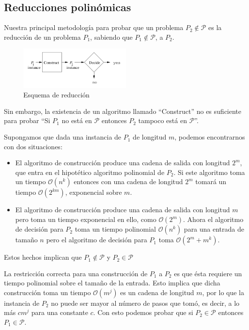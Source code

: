 \documentclass[a4paper]{article}
\begin{document}


\subsection{Reducciones polinómicas}
Nuestra principal metodología para probar que un problema $P_2 \notin \mathcal{P}$
es la reducción de un problema $P_1$, sabiendo que $P_1 \notin \mathcal{P}$, a $P_2$.

\begin{figure}[h]
\centering
\graphicspath{ {./Images/} }
\includegraphics[width=0.5\textwidth]{reduccion.png}
\caption{\label{fig:Reduccion}Esquema de reducción\cite{hopcroft2001introduction}}
\end{figure}
Sin embargo, la existencia de un algoritmo llamado ``Construct'' no es suficiente
para probar ``Si $P_1$ no está en $\mathcal{P}$ entonces $P_2$ tampoco está en $\mathcal{P}$''.

Supongamos que dada una instancia de $P_1$ de longitud $m$, podemos encontrarnos
con dos situaciones:
\begin{itemize}
  \item El algoritmo de construcción produce una cadena de salida con longitud
  $2^{m}$, que entra en el hipotético algoritmo polinomial de $P_2$. Si este
  algoritmo toma un tiempo $\mathcal{O}(n^k)$ entonces con una cadena de
  longitud $2^{m}$ tomará un tiempo $\mathcal{O}(2^{km})$, exponencial sobre $m$.
  \item El algoritmo de construcción produce una cadena de salida con longitud
  $m$ pero toma un tiempo exponencial en ello, como $\mathcal{O}(2^m)$. Ahora el
  algoritmo de decisión para $P_2$ toma un tiempo polinomial $\mathcal{O}(n^k)$
  para una entrada de tamaño $n$ pero el algoritmo de decisión para $P_1$ toma
  $\mathcal{O}(2^{m} + m^{k})$.
\end{itemize}
Estos hechos implican que $P_1 \notin \mathcal{P}$ y $P_2 \in \mathcal{P}$

La restricción correcta para una construcción de $P_1$ a $P_2$ es que  ésta requiere
un tiempo polinomial sobre el tamaño de la entrada.
Esto implica que dicha construcción toma un tiempo $\mathcal{O}(m^{j})$ es un
cadena de longitud $m$, por lo que la instancia de $P_2$ no puede ser mayor al
número de pasos que tomó, es decir, a lo más $cm^{j}$ para una constante $c$.
Con esto podemos probar que si $P_2 \in \mathcal{P}$ entonces $P_1 \in \mathcal{P}$.
\end{document}
